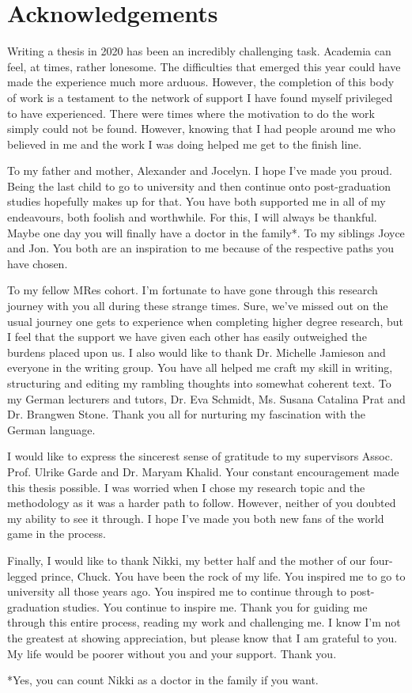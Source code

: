 

\chapter*{Acknowledgements}

Writing a thesis in 2020 has been an incredibly challenging task. Academia can feel, at times, rather lonesome. The difficulties that emerged this year could have made the experience much more arduous. However, the completion of this body of work is a testament to the network of support I have found myself privileged to have experienced. There were times where the motivation to do the work simply could not be found. However, knowing that I had people around me who believed in me and the work I was doing helped me get to the finish line.


To my father and mother, Alexander and Jocelyn. I hope I’ve made you proud. Being the last child to go to university and then continue onto post-graduation studies hopefully makes up for that. You have both supported me in all of my endeavours, both foolish and worthwhile. For this, I will always be thankful. Maybe one day you will finally have a doctor in the family*. To my siblings Joyce and Jon. You both are an inspiration to me because of the respective paths you have chosen.


To my fellow MRes cohort. I’m fortunate to have gone through this research journey with you all during these strange times. Sure, we’ve missed out on the usual journey one gets to experience when completing higher degree research, but I feel that the support we have given each other has easily outweighed the burdens placed upon us. I also would like to thank Dr. Michelle Jamieson and everyone in the writing group. You have all helped me craft my skill in writing, structuring and editing my rambling thoughts into somewhat coherent text. To my German lecturers and tutors, Dr. Eva Schmidt, Ms. Susana Catalina Prat and Dr. Brangwen Stone. Thank you all for nurturing my fascination with the German language.


I would like to express the sincerest sense of gratitude to my supervisors Assoc. Prof. Ulrike Garde and Dr. Maryam Khalid. Your constant encouragement made this thesis possible. I was worried when I chose my research topic and the methodology as it was a harder path to follow. However, neither of you doubted my ability to see it through. I hope I’ve made you both new fans of the world game in the process.


Finally, I would like to thank Nikki, my better half and the mother of our four-legged prince, Chuck. You have been the rock of my life. You inspired me to go to university all those years ago. You inspired me to continue through to post-graduation studies. You continue to inspire me. Thank you for guiding me through this entire process, reading my work and challenging me. I know I’m not the greatest at showing appreciation, but please know that I am grateful to you. My life would be poorer without you and your support. Thank you.

\vfill
*Yes, you can count Nikki as a doctor in the family if you want.
